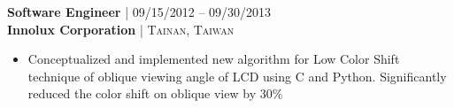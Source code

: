 {\raggedright\normalsize
\textbf{Software Engineer} {\hfill\footnotesize\textsc{| 09/15/2012 -- 09/30/2013}} \\ 
\textbf{Innolux Corporation} {\hfill\footnotesize\textsc{| Tainan, Taiwan}}}

\begin{itemize}[leftmargin=*, topsep=2pt, partopsep=2.5pt]
\setlength\itemsep{1pt}

\item Conceptualized and implemented new algorithm for Low Color Shift technique of oblique viewing angle of LCD using C and Python. Significantly reduced the color shift on oblique view by 30\%

\end{itemize}
